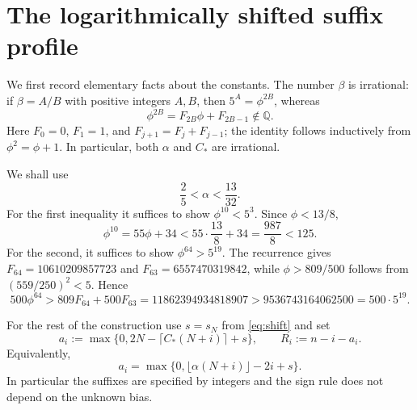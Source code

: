 \documentclass[11pt]{article}
\theoremstyle{definition}
\theoremstyle{remark}
\begin{document}
\section{The logarithmically shifted suffix profile}\label{sec:profile}

We first record elementary facts about the constants. The number $\beta$
is irrational: if $\beta=A/B$ with positive integers $A,B$, then
$5^A=\phi^{2B}$, whereas
\[
 \phi^{2B}=F_{2B}\phi+F_{2B-1}\notin\mathbb Q.
\]
Here $F_0=0$, $F_1=1$, and $F_{j+1}=F_j+F_{j-1}$; the identity follows
inductively from $\phi^2=\phi+1$. In particular, both $\alpha$ and $C_*$
are irrational.

We shall use
\begin{equation}\label{eq:alpha-bounds}
 \frac25<\alpha<\frac{13}{32}.
\end{equation}
For the first inequality it suffices to show $\phi^{10}<5^3$.
Since $\phi<13/8$,
\[
 \phi^{10}=55\phi+34<55\cdot\frac{13}{8}+34=\frac{987}{8}<125.
\]
For the second, it suffices to show $\phi^{64}>5^{19}$. The recurrence gives
$F_{64}=10610209857723$ and $F_{63}=6557470319842$, while
$\phi>809/500$ follows from $(559/250)^2<5$. Hence
\[
 500\phi^{64}>809F_{64}+500F_{63}
 =11862394934818907>9536743164062500=500\cdot5^{19}.
\]

For the rest of the construction use $s=s_N$ from \eqref{eq:shift} and set
\begin{equation}\label{eq:critical-profile}
 a_i:=\max\{0,2N-\lceil C_*(N+i)\rceil+s\},
 \qquad R_i:=n-i-a_i.
\end{equation}
Equivalently,
\begin{equation}\label{eq:profile-floor}
 a_i=\max\{0,\lfloor\alpha(N+i)\rfloor-2i+s\}.
\end{equation}
In particular the suffixes are specified by integers and the sign rule
does not depend on the unknown bias.
\end{document}
